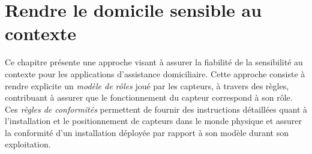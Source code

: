 \chapter{Rendre le domicile sensible au contexte}
\begin{preamble}
Ce chapitre présente une approche visant à assurer la fiabilité de la sensibilité au contexte pour les applications d'assistance domiciliaire. 
Cette approche consiste à rendre explicite un {\em modèle de rôles} joué par les capteurs, à travers des règles, contribuant à assurer que le fonctionnement du capteur correspond à son rôle. Ces {\em règles de conformités} permettent de fournir des instructions détaillées quant à l'installation et le positionnement de capteurs dans le monde physique et assurer la conformité d'un installation déployée par rapport à son modèle durant son exploitation.





\end{preamble}
